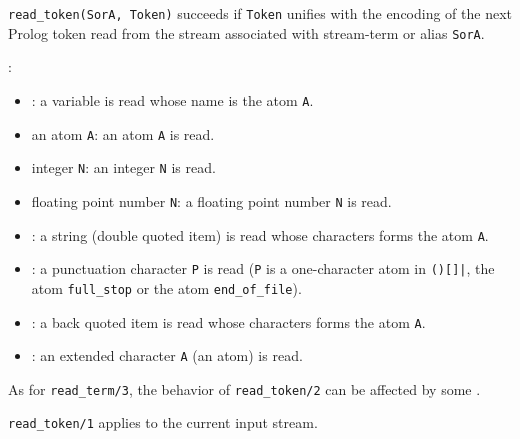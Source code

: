 \texttt{read\_token(SorA, Token)} succeeds if \texttt{Token} unifies with
the encoding of the next Prolog token read from the stream associated with
stream-term or alias \texttt{SorA}.

:

\begin{itemize}

\item {}: a variable is read whose name is the atom
\texttt{A}.

\item an atom \texttt{A}: an atom \texttt{A} is read.

\item integer \texttt{N}: an integer \texttt{N} is read.

\item floating point number \texttt{N}: a floating point number \texttt{N}
is read.

\item {}: a string (double quoted item) is read whose
characters forms the atom \texttt{A}. 

\item {}: a punctuation character \texttt{P} is read
(\texttt{P} is a one-character atom in \texttt{()[]{\lb}|{\rb}}, the atom
\texttt{full\_stop} or the atom \texttt{end\_of\_file}).

\item {}: a back quoted item is read
whose characters forms the atom \texttt{A}.

\item {}: an extended character \texttt{A} (an
atom) is read.

\end{itemize}

As for \texttt{read\_term/3}, the behavior of \texttt{read\_token/2} can be
affected by some  .

\texttt{read\_token/1} applies to the current input stream.

